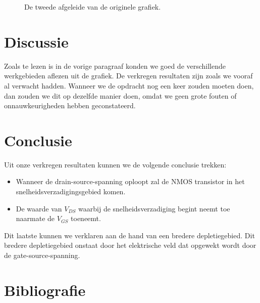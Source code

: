 \documentclass{scrartcl}  %
\begin{document}
\begin{figure}[H]
\centering
	\setlength{} 
	\setlength{}
	
	\caption{De tweede afgeleide van de originele grafiek.}
	\label{fig:Id-2nd-div}
\end{figure}

\section{Discussie}
Zoals te lezen is in de vorige paragraaf konden we goed de verschillende werkgebieden aflezen uit de grafiek. 
De verkregen resultaten zijn zoals we vooraf al verwacht hadden. 
Wanneer we de opdracht nog een keer zouden moeten doen, dan zouden we dit op dezelfde manier doen, omdat we geen grote fouten of onnauwkeurigheden hebben geconstateerd. 

\section{Conclusie}
Uit onze verkregen resultaten kunnen we de volgende conclusie trekken: 
\begin{itemize}
	\item Wanneer de drain-source-spanning oploopt zal de NMOS transistor in het snelheidsverzadigingsgebied komen.
	\item De waarde van $V_{DS}$ waarbij de snelheidsverzadiging begint neemt toe naarmate de $V_{GS}$ toeneemt.
\end{itemize}
Dit laatste kunnen we verklaren aan de hand van een bredere depletiegebied. 
Dit bredere depletiegebied onstaat door het elektrische veld dat opgewekt wordt door de gate-source-spanning.

\newpage
{}
\section{Bibliografie}
\printbibliography
\end{document}
